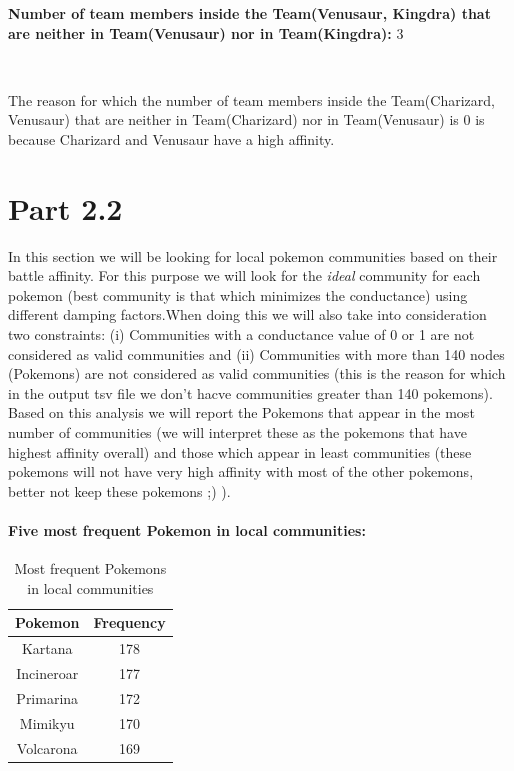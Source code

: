 \documentclass[10pt]{article}
\begin{document}
\textbf{Number of team members inside the Team(Venusaur, Kingdra) that are neither in Team(Venusaur) nor in Team(Kingdra):} 3

\

The reason for which the number of team members inside the Team(Charizard, Venusaur) that are neither in Team(Charizard) nor in Team(Venusaur) is 0 is because Charizard and Venusaur have a high affinity.

\section{Part 2.2}

In this section we will be looking for local pokemon communities based on their battle affinity. For this purpose we will look for the \textit{ideal} community for each pokemon (best community is that which minimizes the conductance) using different damping factors.When doing this we will also take into consideration two constraints: (i) Communities with a conductance value of 0 or 1 are not considered as valid communities and (ii) Communities with more than 140 nodes (Pokemons) are not considered as valid communities (this is the reason for which in the output tsv file we don't hacve communities greater than 140 pokemons). Based on this analysis we will report the Pokemons that appear in the most number of communities (we will interpret these as the pokemons that have highest affinity overall) and those which appear in least communities (these pokemons will not have very high affinity with most of the other pokemons, better not keep these pokemons ;) ).

\paragraph{Five most frequent Pokemon in local communities:}

\begin{table}[H]
\centering
\begin{tabular}{|c|c|}
\hline
\multicolumn{1}{|l|}{\textbf{Pokemon}} &
  \multicolumn{1}{l|}{\textbf{Frequency}} \\ \hline
Kartana  & 178 \\ \hline
Incineroar  & 177 \\ \hline
Primarina  & 172 \\ \hline
Mimikyu  & 170 \\ \hline
Volcarona  & 169 \\ \hline
\end{tabular}
\caption{Most frequent Pokemons in local communities}
\label{tab:my-table}
\end{table}
\end{document}
